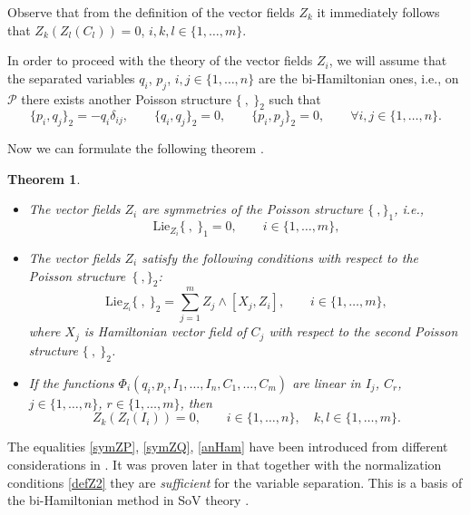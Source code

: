 \documentclass[pdftex]{sigma}
\def\d{\delta}
\numberwithin{equation}{section}
\newtheorem{Theorem}{Theorem}[section]
\begin{document}
 Observe that from the definition of the vector fields
$Z_k$ it immediately follows that
$
 Z_k (Z_l(C_l))\allowbreak=0$, $ i,k,l\in \{1, \dots, m\}$.

In order to proceed with the theory of the vector fields $Z_i$, we
will
 assume that the separated variables $q_i$, $p_j$, $i,j \in
\{1, \dots, n\}$ are the bi-Hamiltonian ones, i.e., on $\mathcal{P}$ there
exists another Poisson structure $\{\ ,\ \}_2$ such that
\begin{equation*}%
\{ p_i, q_j\}_2=-q_i\d_{ij}, \qquad \{q_i,q_j\}_2=0,\qquad
\{p_i,p_j\}_2=0, \qquad \forall i,j \in \{1, \dots, n\}.
\end{equation*}


Now we can formulate the following theorem \cite{SkrAsSoVExCle}.
\begin{Theorem}\quad
\begin{itemize}
\item[$(i)$] The vector fields $Z_i$ are symmetries of the Poisson structure
$\{\ , \}_1$, i.e.,
\begin{equation}\label{symZP}
\mathrm{Lie}_{Z_i} \{\ ,\ \}_1=0, \qquad i\in \{1, \dots, m\},
\end{equation}

\item[$(ii)$] The vector fields $Z_i$ satisfy the following conditions with
respect to the Poisson structure~$\{\ , \}_2$:
\begin{equation}\label{symZQ}
\mathrm{Lie}_{Z_i} \{\ ,\ \}_2= \sum\limits_{j=1}^m Z_j \wedge [X_j, Z_i],
\qquad i\in \{1, \dots, m\},
\end{equation}
where $X_j$ is Hamiltonian vector field of $C_j$ with respect
to the second Poisson structure $\{\ ,\ \}_2$.

\item[$(iii)$] If the functions $\Phi_i(q_i,
p_i, I_1, \dots , I_n, C_1, \dots , C_m)$ are linear in $I_j$, $C_r$, $j\in
\{1, \dots, n\}$, $r\in \{1, \dots, m\}$, then
\begin{equation}\label{anHam}
Z_k (Z_l(I_i))=0, \qquad i\in \{1, \dots, n\}, \quad k,l \in \{1, \dots, m\}.
\end{equation}
\end{itemize}
\end{Theorem}

\begin{Remark}
The equalities \eqref{symZP},
\eqref{symZQ}, \eqref{anHam} have been introduced from different considerations
in \cite{MFP}. It was proven later in \cite{FP} that together with
the normalization conditions \eqref{defZ2} they are {\it sufficient} for
the variable separation. This is a basis of the
bi-Hamiltonian method in SoV theory \cite{MFP,FP,FP2}.
\end{Remark}
\end{document}
